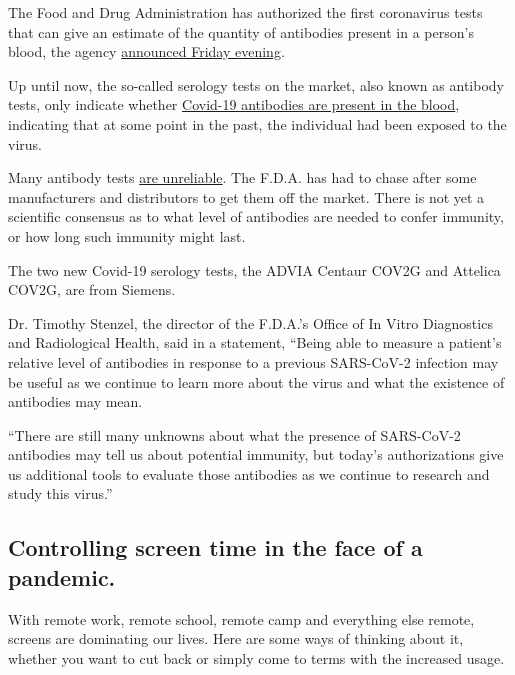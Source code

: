 The Food and Drug Administration has authorized the first coronavirus
tests that can give an estimate of the quantity of antibodies present in
a person's blood, the agency
\href{https://www.fda.gov/news-events/press-announcements/coronavirus-covid-19-update-fda-authorizes-first-tests-estimate-patients-antibodies-past-sars-cov-2}{announced
Friday evening}.

Up until now, the so-called serology tests on the market, also known as
antibody tests, only indicate whether
\href{https://www.nytimes.com/2020/07/26/health/coronvirus-antibody-tests.html}{Covid-19
antibodies are present in the blood}, indicating that at some point in
the past, the individual had been exposed to the virus.

Many antibody tests
\href{https://www.nytimes.com/2020/05/04/health/fda-antibody-tests-coronavirus.html}{are
unreliable}. The F.D.A. has had to chase after some manufacturers and
distributors to get them off the market. There is not yet a scientific
consensus as to what level of antibodies are needed to confer immunity,
or how long such immunity might last.

The two new Covid-19 serology tests, the ADVIA Centaur COV2G and
Attelica COV2G, are from Siemens.

Dr. Timothy Stenzel, the director of the F.D.A.'s Office of In Vitro
Diagnostics and Radiological Health, said in a statement, ``Being able
to measure a patient's relative level of antibodies in response to a
previous SARS-CoV-2 infection may be useful as we continue to learn more
about the virus and what the existence of antibodies may mean.

``There are still many unknowns about what the presence of SARS-CoV-2
antibodies may tell us about potential immunity, but today's
authorizations give us additional tools to evaluate those antibodies as
we continue to research and study this virus.''

\hypertarget{controlling-screen-time-in-the-face-of-a-pandemic}{%
\subsection{Controlling screen time in the face of a
pandemic.}\label{controlling-screen-time-in-the-face-of-a-pandemic}}

With remote work, remote school, remote camp and everything else remote,
screens are dominating our lives. Here are some ways of thinking about
it, whether you want to cut back or simply come to terms with the
increased usage.

